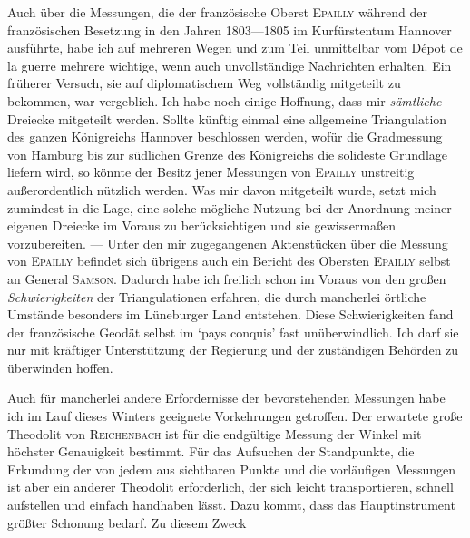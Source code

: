 Auch über die Messungen, die der französische Oberst \textsc{Epailly} während der französischen Besetzung in den Jahren 1803—1805 im Kurfürstentum Hannover ausführte, habe ich auf mehreren Wegen und zum Teil unmittelbar vom Dépot de la guerre mehrere wichtige, wenn auch unvollständige Nachrichten erhalten. Ein früherer Versuch, sie auf diplomatischem Weg vollständig mitgeteilt zu bekommen, war vergeblich. Ich habe noch einige Hoffnung, dass mir \textit{sämtliche} Dreiecke mitgeteilt werden. Sollte künftig einmal eine allgemeine Triangulation des ganzen Königreichs Hannover beschlossen werden, wofür die Gradmessung von Hamburg bis zur südlichen Grenze des Königreichs die solideste Grundlage liefern wird, so könnte der Besitz jener Messungen von \textsc{Epailly} unstreitig außerordentlich nützlich werden. Was mir davon mitgeteilt wurde, setzt mich zumindest in die Lage, eine solche mögliche Nutzung bei der Anordnung meiner eigenen Dreiecke im Voraus zu berücksichtigen und sie gewissermaßen vorzubereiten. — Unter den mir zugegangenen Aktenstücken über die Messung von \textsc{Epailly} befindet sich übrigens auch ein Bericht des Obersten \textsc{Epailly} selbst an General \textsc{Samson}. Dadurch habe ich freilich schon im Voraus von den großen \textit{Schwierigkeiten} der Triangulationen erfahren, die durch mancherlei örtliche Umstände besonders im Lüneburger Land entstehen. Diese Schwierigkeiten fand der französische Geodät selbst im ‘pays conquis’ fast unüberwindlich. Ich darf sie nur mit kräftiger Unterstützung der Regierung und der zuständigen Behörden zu überwinden hoffen.

Auch für mancherlei andere Erfordernisse der bevorstehenden Messungen habe ich im Lauf dieses Winters geeignete Vorkehrungen getroffen. Der erwartete große Theodolit von \textsc{Reichenbach} ist für die endgültige Messung der Winkel mit höchster Genauigkeit bestimmt. Für das Aufsuchen der Standpunkte, die Erkundung der von jedem aus sichtbaren Punkte und die vorläufigen Messungen ist aber ein anderer Theodolit erforderlich, der sich leicht transportieren, schnell aufstellen und einfach handhaben lässt. Dazu kommt, dass das Hauptinstrument größter Schonung bedarf. Zu diesem Zweck
